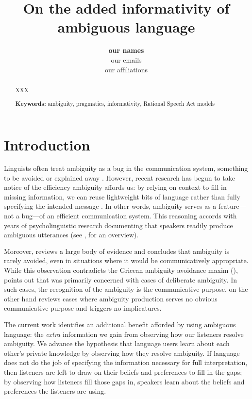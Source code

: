 \documentclass[10pt,a4paper]{article}
\title{On the added informativity of ambiguous language}
\author{\large \textbf{our names}\\
our emails\\
our affiliations}
\begin{document}
\maketitle

\begin{abstract}
XXX


\textbf{Keywords:} 
ambiguity, pragmatics, informativity, Rational Speech Act models

\end{abstract}

\section{Introduction}

Linguists often treat ambiguity as a bug in the communication system, something to be avoided or explained away \cite{grice1975,chomsky2002minimalism}. However, recent research has begun to take notice of the efficiency ambiguity affords us: by relying on context to fill in missing information, we can reuse lightweight bits of language rather than fully specifying the intended message \cite{levinson2000,piantadosietal2012,wasow2015}. In other words, ambiguity serves as a feature---not a bug---of an efficient communication system. This reasoning accords with years of psycholinguistic research documenting that speakers readily produce ambiguous utterances (see , for an overview). 

Moreover,  reviews a large body of evidence and concludes that ambiguity is rarely avoided, even in situations where it would be communicatively appropriate. While this observation contradicts the Gricean ambiguity avoidance maxim (), \citeauthor{wasow2015} points out that \citeauthor{grice1975} was primarily concerned with cases of deliberate ambiguity. In such cases, the recognition of the ambiguity is the communicative purpose. \citeauthor{wasow2015} on the other hand reviews cases where ambiguity production serves no obvious communicative purpose and triggers no implicatures. 

The current work identifies an additional benefit afforded by using ambiguous language: the \emph{extra} information we gain from observing how our listeners resolve ambiguity. We advance the hypothesis that language users learn about each other's private knowledge by observing how they resolve ambiguity. If language does not do the job of specifying the information necessary for full interpretation, then listeners are left to draw on their beliefs and preferences to fill in the gaps; by observing how listeners fill those gaps in, speakers learn about the beliefs and preferences the listeners are using. 
\end{document}
